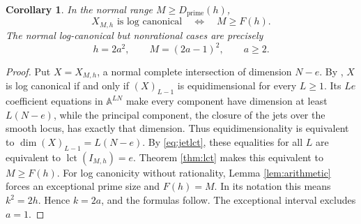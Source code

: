 \documentclass[11pt]{article}
\numberwithin{equation}{section}
\newtheorem{corollary}[theorem]{Corollary}
\theoremstyle{remark}
\newcommand{\A}{\mathbb A}
\newcommand{\lct}{\operatorname{lct}}
\newcommand{\Dprime}{D_{\mathrm{prime}}}
\begin{document}
\begin{corollary}\label{cor:lc}
In the normal range $M\ge\Dprime(h)$,
\[
 X_{M,h}\text{ is log canonical}\quad\Longleftrightarrow
       \quad M\ge F(h).
\]
The normal log-canonical but nonrational cases are precisely
\[
 h=2a^2,\qquad M=(2a-1)^2,\qquad a\ge2.
\]
\end{corollary}
\begin{proof}
Put $X=X_{M,h}$, a normal complete intersection of dimension $N-e$.
By \cite[Theorem 1.3]{EM}, $X$ is log canonical if and only if
$(X)_{L-1}$ is equidimensional for every $L\ge1$.
Its $Le$ coefficient equations in $\A^{LN}$ make every component
have dimension at least $L(N-e)$, while the principal component,
the closure of the jets over the smooth locus, has exactly that dimension.
Thus equidimensionality is equivalent to
$\dim(X)_{L-1}=L(N-e)$. By \eqref{eq:jetlct}, these equalities
for all $L$ are equivalent to $\lct(I_{M,h})=e$.
Theorem \ref{thm:lct} makes this equivalent to $M\ge F(h)$.
For log canonicity without rationality, Lemma
\ref{lem:arithmetic} forces an exceptional prime size and
$F(h)=M$. In its notation this means $k^2=2h$.
Hence $k=2a$, and the formulas follow. The exceptional
interval excludes $a=1$.
\end{proof}
\end{document}

